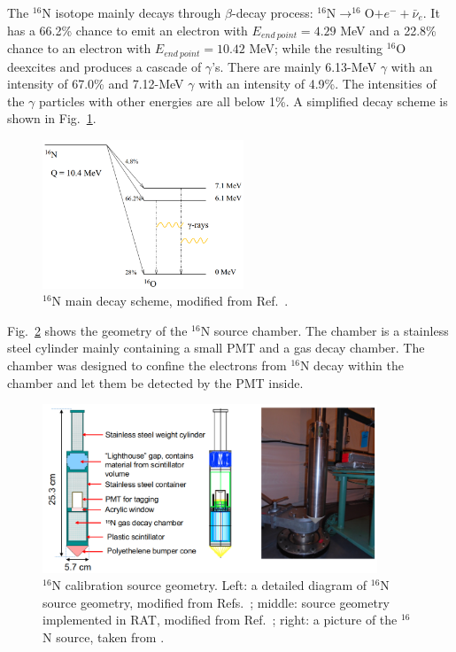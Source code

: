 The $^{16}$N isotope mainly decays through $\beta$-decay process: $^{16}$N$\to ^{16}$O$+e^-+\bar{\nu}_e$. It has a 66.2\% chance to emit an electron with $E_{end~point}=4.29$ MeV and a 22.8\% chance to an electron with $E_{end~point}=10.42$ MeV; while the resulting $^{16}$O deexcites and produces a cascade of $\gamma$'s. There are mainly 6.13-MeV $\gamma$ with an intensity of 67.0\% and 7.12-MeV $\gamma$ with an intensity of 4.9\%. The intensities of the $\gamma$ particles with other energies are all below 1\%\cite{nndc}. A simplified decay scheme is shown in Fig.~\ref{n16decay}.

\begin{figure}[!htb]
	\centering
	\includegraphics[width=6cm]{n16_decay.png}
	\caption[$^{16}$N main decay scheme]{$^{16}$N main decay scheme, modified from Ref.~\cite{dragowsky200216n}.}
	\label{n16decay}
\end{figure}

Fig.~\ref{n16pic} shows the geometry of the $^{16}$N source chamber. The chamber is a stainless steel cylinder mainly containing a small PMT and a gas decay chamber. The chamber was designed to confine the electrons from $^{16}$N decay within the chamber and let them be detected by the PMT inside\cite{dragowsky1999sudbury}.






\begin{figure}[!htb]
	\centering
	\includegraphics[width=10cm]{n16geom.png}
	\caption[$^{16}$N calibration source geometry.]{$^{16}$N calibration source geometry. Left: a detailed diagram of $^{16}$N source geometry, modified from Refs.~\cite{maclellan2009energy,matt_deployedsource}; middle: source geometry implemented in RAT, modified from Ref.~\cite{n16geom_zach}; right: a picture of the $^{16}$N source, taken from \cite{n16pic}.}
	\label{n16pic}
\end{figure}

